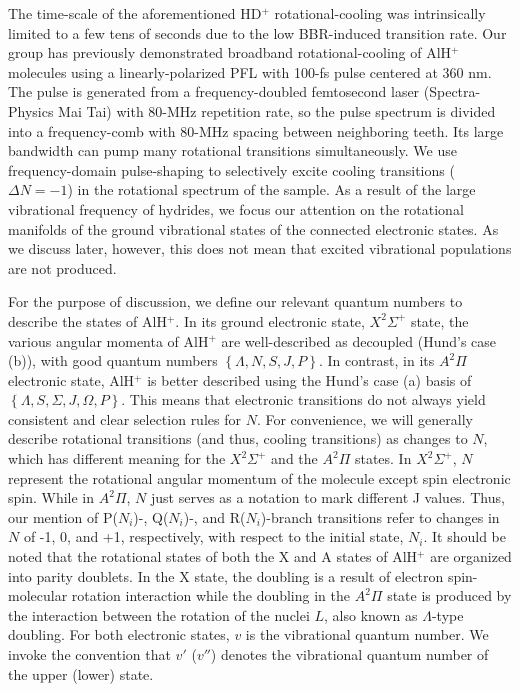 \documentclass[nofootinbib,aip,jcp,reprint]{revtex4-1}
\begin{document}
The time-scale of the aforementioned HD$^+$ rotational-cooling was intrinsically limited to a few tens of seconds due to the low BBR-induced transition rate. Our group has previously demonstrated broadband rotational-cooling of AlH$^+$ molecules using a linearly-polarized PFL with 100-fs pulse centered at 360 nm. The pulse is generated from a frequency-doubled femtosecond laser (Spectra-Physics Mai Tai) with 80-MHz repetition rate, so the pulse spectrum is divided into a frequency-comb with 80-MHz spacing between neighboring teeth. Its large bandwidth can pump many rotational transitions simultaneously. We use frequency-domain pulse-shaping to selectively excite cooling transitions ($\Delta N=-1$) in the rotational spectrum of the sample. As a result of the large vibrational frequency of hydrides, we focus our attention on the rotational manifolds of the ground vibrational states of the connected electronic states. As we discuss later, however, this does not mean that excited vibrational populations are not produced.%

For the purpose of discussion, we define our relevant quantum numbers to describe the states of AlH$^+$. In its ground electronic state, $X^2\Sigma^+$ state, the various angular momenta of AlH$^+$ are well-described as decoupled (Hund's case (b)), with good quantum numbers  $\left\lbrace\right.\! \Lambda, N, S, J, P \!\left.\right\rbrace$. In contrast, in its $A^2\Pi$  electronic state, AlH$^+$ is better described using the Hund's case (a) basis of $\left\lbrace\right.\! \Lambda, S, \Sigma, J, \Omega, \mathit{P} \!\left.\right\rbrace$. This means that electronic transitions do not always yield consistent and clear selection rules for $N$. For convenience, we will generally describe rotational transitions (and thus, cooling transitions) as changes to $N$, which has different meaning for the $X^2\Sigma^+$ and the $A^2\Pi$ states. In $X^2\Sigma^+$, $N$ represent the rotational angular momentum of the molecule except spin electronic spin. While in $A^2\Pi$, $N$ just serves as a notation to mark different J values.  Thus, our mention of P($N_i$)-, Q($N_i$)-, and R($N_i$)-branch transitions refer to changes in $N$ of -1, 0, and +1, respectively, with respect to the initial state, $N_i$. It should be noted that the rotational states of both the X and A states of AlH$^+$ are organized into parity doublets. In the X state, the doubling is a result of electron spin-molecular rotation interaction while the doubling in the $A^2\Pi$ state is produced by the interaction between the rotation of the nuclei $L$, also known as $\Lambda$-type  doubling. For both electronic states, $v$ is the vibrational quantum number. We invoke the convention that $v'$ ($v''$) denotes the vibrational quantum number of the upper (lower) state.
\end{document}
